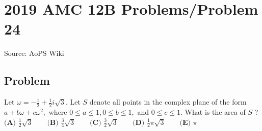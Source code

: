 \documentclass[12pt]{article}
\begin{document}
\section*{{2019 AMC 12B Problems/Problem 24}}
Source: AoPS Wiki

\subsection*{Problem}
Let $\omega=-\tfrac{1}{2}+\tfrac{1}{2}i\sqrt3.$ Let $S$ denote all points in the complex plane of the form $a+b\omega+c\omega^2,$ where $0\leq a \leq 1,0\leq b\leq 1,$ and $0\leq c\leq 1.$ What is the area of $S$ ? $\textbf{(A) } \frac{1}{2}\sqrt3 \qquad\textbf{(B) } \frac{3}{4}\sqrt3 \qquad\textbf{(C) } \frac{3}{2}\sqrt3\qquad\textbf{(D) } \frac{1}{2}\pi\sqrt3 \qquad\textbf{(E) } \pi$
\end{document}
